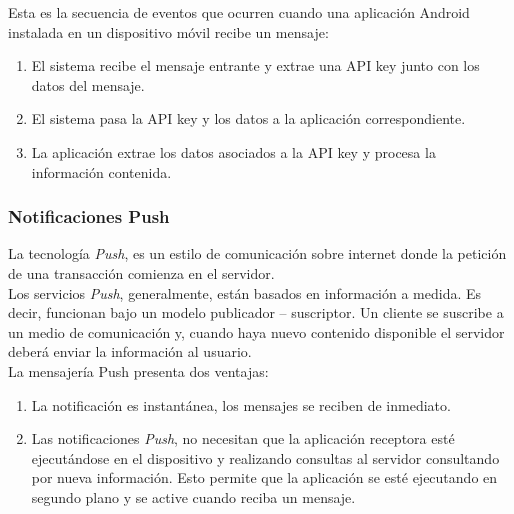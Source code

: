 
Esta es la secuencia de eventos que ocurren cuando una aplicación Android instalada en un dispositivo móvil recibe un mensaje:
\begin{enumerate}
\item El sistema recibe el mensaje entrante y extrae una API key junto con los datos del mensaje.
\item El sistema pasa la API key y los datos a la aplicación correspondiente.
\item La aplicación extrae los datos asociados a la API key y procesa la información contenida.
\end{enumerate}

\subsubsection{Notificaciones Push}

La tecnología \textit{Push}, es un estilo de comunicación sobre internet donde la petición de una transacción comienza en el servidor.\\ 

Los servicios \textit{Push}, generalmente, están basados en información a medida. Es decir, funcionan bajo un modelo publicador – suscriptor. Un cliente se suscribe  a un medio de comunicación y, cuando haya nuevo contenido disponible el servidor deberá enviar la información al usuario.\\ 

La mensajería Push presenta dos ventajas:

\begin{enumerate}
\item La notificación es instantánea, los mensajes se reciben de inmediato.
\item Las notificaciones \textit{Push}, no necesitan que la aplicación receptora esté ejecutándose en el dispositivo y realizando consultas al servidor consultando por nueva información. Esto permite que la aplicación se esté ejecutando en segundo plano y se active cuando reciba un mensaje.
\end{enumerate}

